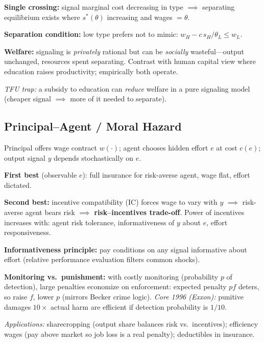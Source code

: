 \textbf{Single crossing:} signal marginal cost decreasing in type $\implies$ separating equilibrium exists where $s^*(\theta)$ increasing and wages $= \theta$.

\textbf{Separation condition:} low type prefers not to mimic: $w_H - c\,s_H/\theta_L \leq w_L$.

\textbf{Welfare:} signaling is \textit{privately} rational but can be \textit{socially} wasteful---output unchanged, resources spent separating. Contrast with human capital view where education raises productivity; empirically both operate.

\textit{TFU trap:} a subsidy to education can \textit{reduce} welfare in a pure signaling model (cheaper signal $\implies$ more of it needed to separate).

\subsection{Principal--Agent / Moral Hazard}
Principal offers wage contract $w(\cdot)$; agent chooses hidden effort $e$ at cost $c(e)$; output signal $y$ depends stochastically on $e$.

\textbf{First best} (observable $e$): full insurance for risk-averse agent, wage flat, effort dictated.

\textbf{Second best:} incentive compatibility (IC) forces wage to vary with $y$ $\implies$ risk-averse agent bears risk $\implies$ \textbf{risk--incentives trade-off}. Power of incentives increases with: agent risk tolerance, informativeness of $y$ about $e$, effort responsiveness.

\textbf{Informativeness principle:} pay conditions on any signal informative about effort (relative performance evaluation filters common shocks).

\textbf{Monitoring vs.\ punishment:} with costly monitoring (probability $p$ of detection), large penalties economize on enforcement: expected penalty $pf$ deters, so raise $f$, lower $p$ (mirrors Becker crime logic). \textit{Core 1996 (Exxon):} punitive damages $10\times$ actual harm are efficient if detection probability is $1/10$.

\textit{Applications:} sharecropping (output share balances risk vs.\ incentives); efficiency wages (pay above market so job loss is a real penalty); deductibles in insurance.
